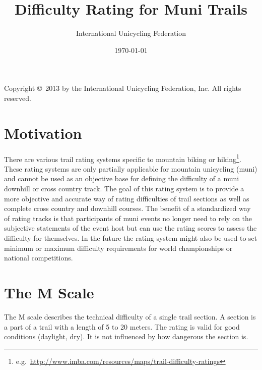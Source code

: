 \documentclass[a4paper,oneside]{scrartcl}
\title{Difficulty Rating for Muni Trails}
\author{International Unicycling Federation}
\date{\today}
\begin{document}
\maketitle
\thispagestyle{empty}
Copyright \copyright~2013 by the International Unicycling Federation, Inc. All rights reserved.

\vfill

\tableofcontents


\newpage

\section{Motivation}

There are various trail rating systems specific to mountain biking or hiking\footnote{e.g.\ \url{http://www.imba.com/resources/maps/trail-difficulty-ratings}}.
These rating systems are only partially applicable for mountain unicycling (muni)
and cannot be used as an objective base for defining the difficulty of a muni
downhill or cross country track.
The goal of this rating system is to provide a more objective and accurate way
of rating difficulties of trail sections as well as complete cross country and
downhill courses. 
The benefit of a standardized way of rating tracks is that participants of muni
events no longer need to rely on the subjective statements of the event host but
can use the rating scores to assess the difficulty for themselves.
In the future the rating system might also be used to set minimum or maximum
difficulty requirements for world championships or national competitions.


\section{The M Scale}
\label{sec:difficulty-m-scale}

The M scale describes the technical difficulty of a single trail section. A
section is a part of a trail with a length of 5 to 20 meters.
The rating is valid for good conditions (daylight, dry). It is not influenced by how dangerous
the section is.
\end{document}
